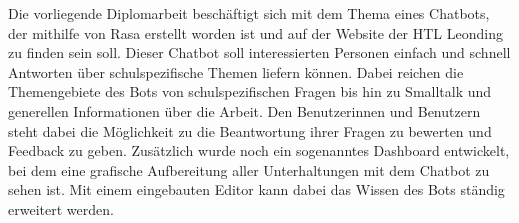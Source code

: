 Die vorliegende Diplomarbeit beschäftigt sich mit dem Thema eines Chatbots, der mithilfe von Rasa erstellt worden ist und auf der Website der HTL Leonding zu finden sein soll.
Dieser Chatbot soll interessierten Personen einfach und schnell Antworten über schulspezifische Themen liefern können.
Dabei reichen die Themengebiete des Bots von schulspezifischen Fragen bis hin zu Smalltalk und generellen Informationen über die Arbeit.
Den Benutzerinnen und Benutzern steht dabei die Möglichkeit zu die Beantwortung ihrer Fragen zu bewerten und Feedback zu geben.
Zusätzlich wurde noch ein sogenanntes Dashboard entwickelt, bei dem eine grafische Aufbereitung aller Unterhaltungen mit dem Chatbot zu sehen ist.
Mit einem eingebauten Editor kann dabei das Wissen des Bots ständig erweitert werden.